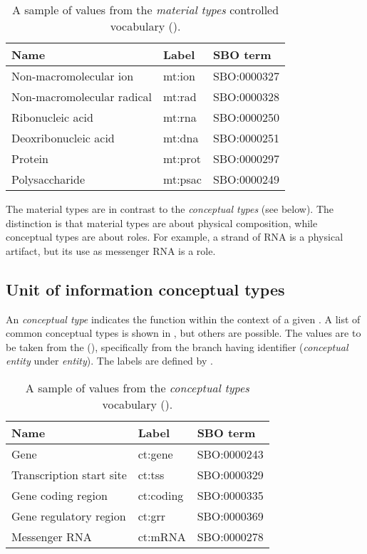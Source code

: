\begin{table}[h]
  \centering
  \begin{tabular}{l>{\ttfamily}l>{\ttfamily}l}
    \toprule
    \textbf{Name}              & \textbf{\rmfamily Label} & \textbf{\rmfamily SBO term} \\
    \midrule
    Non-macromolecular ion     & mt:ion  & SBO:0000327\\
    Non-macromolecular radical & mt:rad  & SBO:0000328\\
    Ribonucleic acid           & mt:rna  & SBO:0000250\\
    Deoxribonucleic acid       & mt:dna  & SBO:0000251\\
    Protein                    & mt:prot & SBO:0000297\\
    Polysaccharide             & mt:psac & SBO:0000249\\
    \bottomrule
  \end{tabular}
  \caption{A sample of values from the \emph{material types} controlled
    vocabulary ().}
  \label{tab:af:material-types-cv}
\end{table}

The material types are in contrast to the \emph{conceptual types} (see below).  The distinction is that material types are about physical composition, while conceptual types are about roles.  For example, a strand of RNA is a physical artifact, but its use as messenger RNA is a role.

\subsection{Unit of information conceptual types}
\label{sec:af:conceptual-types-cv}

An  \emph{conceptual type} indicates the function within the context of a given \AF.  A list of common conceptual types is shown in , but others are possible.  The values are to be taken from the \sbo (\sbourl), specifically from the branch having identifier  ($\!$\emph{conceptual entity} under \emph{entity}).  The labels are defined by \SBGNAFLone.

\begin{table}[h]
  \centering
  \begin{tabular}{l>{\ttfamily}l>{\ttfamily}l}
    \toprule
    \textbf{Name}              & \textbf{\rmfamily Label} & \textbf{\rmfamily SBO term} \\
    \midrule
    Gene                      & ct:gene   & SBO:0000243\\
    Transcription start site  & ct:tss    & SBO:0000329\\
    Gene coding region        & ct:coding & SBO:0000335\\
    Gene regulatory region    & ct:grr    & SBO:0000369\\
    Messenger RNA             & ct:mRNA   & SBO:0000278\\
    \bottomrule
  \end{tabular}
  \caption{A sample of values from the \emph{conceptual types} vocabulary
    ().}
  \label{tab:af:conceptual-types-cv}
\end{table}

